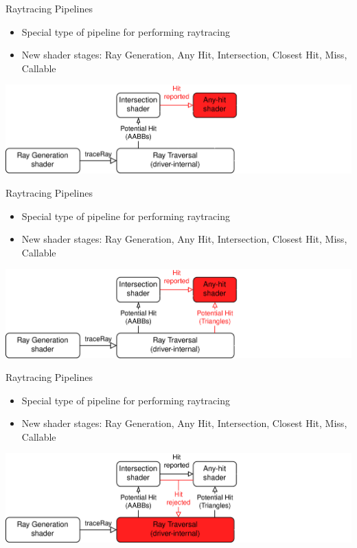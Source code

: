 \documentclass[aspectratio=169,t]{beamer}
\begin{document}
\begin{slide}{Raytracing Pipelines}
    \begin{itemize}
     \item Special type of pipeline for performing raytracing
     \item New shader stages: Ray Generation, Any Hit, Intersection, Closest Hit, Miss, Callable
    \end{itemize}
    \includegraphics[width=0.95\linewidth]{graphics/RTStages4.png}
\end{slide}

\begin{slide}{Raytracing Pipelines}
    \begin{itemize}
     \item Special type of pipeline for performing raytracing
     \item New shader stages: Ray Generation, Any Hit, Intersection, Closest Hit, Miss, Callable
    \end{itemize}
    \includegraphics[width=0.95\linewidth]{graphics/RTStages5.png}
\end{slide}

\begin{slide}{Raytracing Pipelines}
    \begin{itemize}
     \item Special type of pipeline for performing raytracing
     \item New shader stages: Ray Generation, Any Hit, Intersection, Closest Hit, Miss, Callable
    \end{itemize}
    \includegraphics[width=0.95\linewidth]{graphics/RTStages6.png}
\end{slide}
\end{document}

